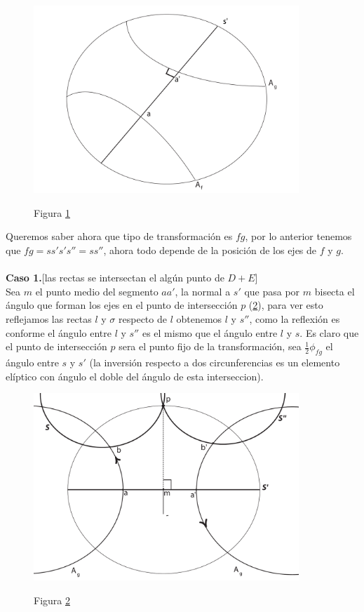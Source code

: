 \begin{figure}[h]
  \centering
  \includegraphics[width=10cm]{lemma1-dem1.pdf}\\
  \caption{Figura \ref{lemma1-dem1} }\label{lemma1-dem1}
\end{figure}


Queremos saber ahora que tipo de transformaci\'on es $fg$, por lo
anterior tenemos que $fg= ss's's'' = ss''$, ahora todo depende de la
posici\'on de los ejes de $f$ y $g$. \\ \\


\textbf{ Caso 1.}[las rectas se intersectan el alg\'un punto de
$D+E$] \\


Sea $m$ el punto medio del segmento $aa'$, la normal a $s'$ que
pasa por $m$ bisecta el \'angulo que forman los ejes en el punto de
intersecci\'on $p$ (\ref{lemma1-dibujo4}), para
ver esto reflejamos las rectas $l$ y $\sigma$ respecto de $l$
obtenemos $l$ y $s''$, como la reflexi\'on es conforme el \'angulo
entre $l$ y $s''$ es el mismo que el \'angulo entre $l$ y $s$. Es
claro que el punto de intersecci\'on $p$ sera el punto fijo de la
transformaci\'on, sea $\frac{1}{2} \phi_{fg}$ el \'angulo entre $s$
y $s'$ (la inversi\'on respecto a dos circunferencias es un elemento el\'iptico con \'angulo el doble del \'angulo de
esta interseccion). \\

\begin{figure}[h]
  \centering
  \includegraphics[width=10cm]{lemma1-dibujo4}\\
  \caption{Figura \ref{lemma1-dibujo4}}\label{lemma1-dibujo4}
\end{figure}



